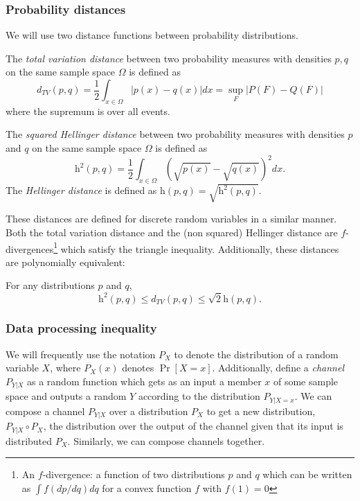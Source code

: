 \documentclass[final, 12pt]{colt2018}
\providecommand{\helli}{\mathrm{h}}
\begin{document}
\subsubsection{Probability distances \label{sec:pr-dist}}

We will use two distance functions between probability distributions.

\begin{definition}
The \emph{total variation distance} between two probability measures with densities $p,q$  on the same sample space $\Omega$ is defined as
\[
d_{TV}(p,q) = \frac{1}{2} \int_{x \in \Omega} \lvert p(x) - q(x) \rvert dx = \sup_F \lvert P(F) - Q(F) \rvert
\]
where the supremum is over all events.
\end{definition}

\begin{definition}
The \emph{squared Hellinger distance} between two probability measures with densities $p$ and $q$ on the same sample space $\Omega$ is defined as
\[
\helli^2(p,q) = \frac{1}{2} \int_{x \in \Omega} \left( \sqrt{p(x)} - \sqrt{q(x)} \right)^2 dx.
\]
The \emph{Hellinger distance} is defined as $\helli(p,q) = \sqrt{\helli^2(p,q)}$.
\end{definition}

These distances are defined for discrete random variables in a similar manner. Both the total variation distance and the (non squared) Hellinger distance are $f$-divergences\footnote{An $f$-divergence: a function of two distributions $p$ and $q$ which can be written as $\int f(dp/dq)dq$ for a convex function $f$ with $f(1)=0$} which satisfy the triangle inequality. Additionally, these distances are polynomially equivalent:

\begin{proposition} \label{prop:heltv}
For any distributions $p$ and $q$,
\begin{equation} \label{eq:dist-ineq}
\helli^2(p,q) \le d_{TV}(p,q) \le \sqrt{2} \helli(p,q).
\end{equation}
\end{proposition}

\subsubsection{Data processing inequality}

We will frequently use the notation $P_X$ to denote the distribution of a random variable $X$, where $P_X(x)$ denotes $\Pr[X=x]$. Additionally, define a \emph{channel} $P_{Y | X}$ as a random function which gets as an input a member $x$ of some sample space and outputs a random $Y$ according to the distribution $P_{Y | X=x}$. We can compose a channel $P_{Y|X}$ over a distribution $P_X$ to get a new distribution, $P_{Y|X} \circ P_X$, the distribution over the output of the channel given that its input is distributed $P_X$. Similarly, we can compose channels together.
\end{document}
